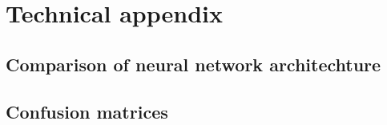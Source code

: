 \appendix
\section{Technical appendix}
\label{sec:appendix}

\subsection{Comparison of neural network architechture}
\label{sec:appendixA}

\subsection{Confusion matrices}
\label{sec:appendixB}
